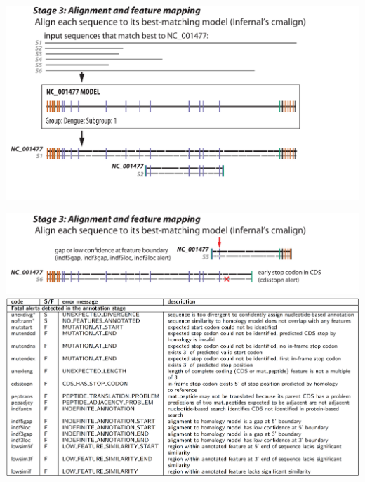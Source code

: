 \documentclass[landscape]{slides}
\begin{document}
\begin{slide}
\begin{center}

\includegraphics[width=10.5in]{figs/v-annotate-stage3-1}
\end{center}

\vfill
\end{slide}
%
%
%
%
\begin{slide}
\begin{center}

\includegraphics[width=10.5in]{figs/v-annotate-stage3-4}
\includegraphics[width=10.5in]{figs/ss-alignment-alert-list}

\end{center}
\vfill
\end{slide}
\end{document}

